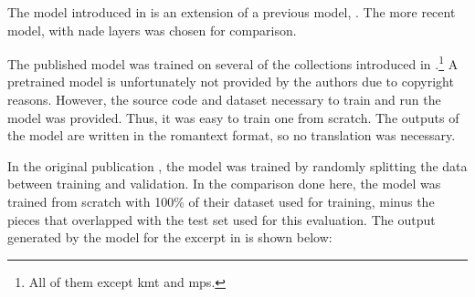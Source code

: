 
The model introduced in \textcite{micchi2021deep} is an
extension of a previous model, \textcite{micchi2020not}. The
more recent model, with \gls{nade} layers was chosen for
comparison.

The published model was trained on several of the
collections introduced in
.\footnote{All of
them except \gls{kmt} and \gls{mps}.} A pretrained model is
unfortunately not provided by the authors due to copyright
reasons. However, the source code and dataset necessary to
train and run the model was provided. Thus, it was easy to
train one from scratch. The outputs of the model are written
in the \gls{romantext} format, so no translation was
necessary. 

In the original publication \parencite{micchi2021deep}, the
model was trained by randomly splitting the data between
training and validation. In the comparison done here, the
model was trained from scratch with 100\% of their dataset
used for training, minus the pieces that overlapped with the
test set used for this evaluation. The output generated by
the model for the excerpt in  is shown
below:
